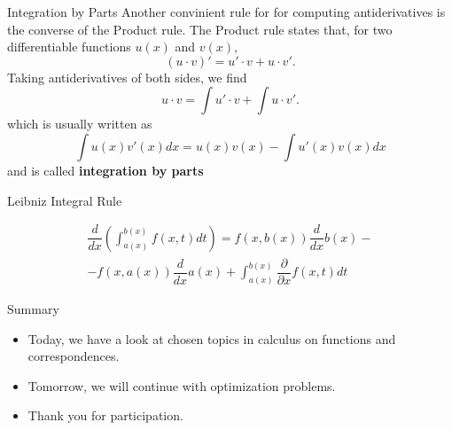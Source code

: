 \documentclass{beamer}
\begin{document}
\begin{frame}{Integration by Parts}
    Another convinient rule for for computing antiderivatives is the converse of the Product rule. The Product rule states that, for two differentiable functions $u(x)$ and $v(x)$, 
    \[(u\cdot v)'=u'\cdot v+u \cdot v'. 
    \]
    Taking antiderivatives of both sides, we find 
    \[u\cdot v=\int u'\cdot v+\int u \cdot v'. 
    \]
    which is usually written as 
    \[\int u(x) v'(x)dx=u(x)v(x)- \int u'(x)v(x) dx
    \] and is called \textbf{integration by parts}
\end{frame}

\begin{frame}{ Leibniz Integral Rule}
    \begin{block}{ }
    \begin{align*}
        \dfrac{d}{dx}\left( \int_{a(x)}^{b(x)} f(x,t)dt\right)= f(x, b(x))\dfrac{d}{dx}b(x)-\\- f(x, a(x))\dfrac{d}{dx}a(x)+ \int_{a(x)}^{b(x)} \dfrac{\partial }{\partial x}f(x,t)dt
    \end{align*}
    \end{block}
\end{frame}

\begin{frame}{Summary}
\begin{itemize}
    \item Today, we have a look at  chosen topics in calculus on functions and correspondences. 
    \item Tomorrow, we will continue with optimization problems. 
    \item Thank you for participation. 
\end{itemize}

\end{frame}
\end{document}
